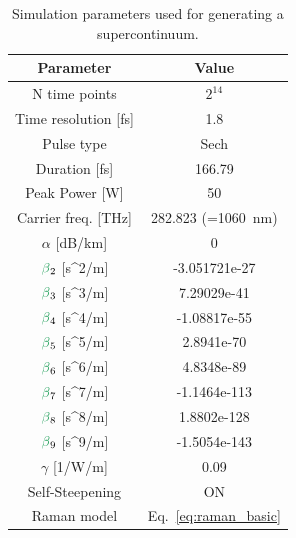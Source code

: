\begin{table}[]
\centering
\begin{tabular}{cc}
\textbf{Parameter}                      & \textbf{Value}                                  \\ \hline
N time points                           & $2^{14}$                                          \\
Time resolution {[}fs{]}                & 1.8                                             \\\hline
Pulse type                              & Sech                                            \\
Duration {[}fs{]}                       & 166.79                                          \\
Peak Power {[}W{]}                      & 50                                              \\
Carrier freq. {[}THz{]}                 & 282.823 (=1060~nm)                         \\\hline
$\alpha$ {[}dB/km{]}                    & 0                                               \\
$\betag_2$ {[}s\textasciicircum{}2/m{]} & -3.051721e-27                                   \\
$\betag_3$ {[}s\textasciicircum{}3/m{]} & 7.29029e-41                                     \\
$\betag_4$ {[}s\textasciicircum{}4/m{]} & -1.08817e-55                                    \\
$\betag_5$ {[}s\textasciicircum{}5/m{]} & 2.8941e-70                                      \\
$\betag_6$ {[}s\textasciicircum{}6/m{]} & 4.8348e-89                                      \\
$\betag_7$ {[}s\textasciicircum{}7/m{]} & -1.1464e-113                                    \\
$\betag_8$ {[}s\textasciicircum{}8/m{]} & 1.8802e-128                                     \\
$\betag_9$ {[}s\textasciicircum{}9/m{]} & -1.5054e-143                                    \\
$\gamma$ {[}1/W/m{]}                    & 0.09                                            \\
Self-Steepening                         & ON                                              \\
Raman model                             & Eq.~\ref{eq:raman_basic}
\end{tabular}
\caption{Simulation parameters used for generating a supercontinuum.}
\label{tab:SC_params}
\end{table}

